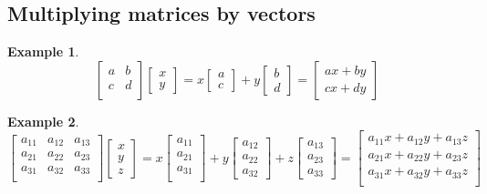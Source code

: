 \documentclass[table]{article}
\theoremstyle{definition}
\newtheorem{ex}{Example}[section]
\newcommand\y{\cellcolor{green!10}}
\begin{document}
  \subsection{Multiplying matrices by vectors}
  \begin{ex}
    \begin{equation}
      \begin{bmatrix}
        a & b \\
        c & d \\
      \end{bmatrix}
      \begin{bmatrix}
        x \\ y
      \end{bmatrix} 
       = x \begin{bmatrix}
        a \\ c
       \end{bmatrix}
       + y \begin{bmatrix}
         b \\ d
       \end{bmatrix}
       = \begin{bmatrix}
         ax + by \\
         cx + dy
       \end{bmatrix}
    \end{equation}
  \end{ex}
  \begin{ex}
    \begin{equation}
      \begin{bmatrix}
        a_{11} & a_{12} & a_{13} \\
        a_{21} & a_{22} & a_{23} \\
        a_{31} & a_{32} & a_{33} \\
      \end{bmatrix}
      \begin{bmatrix}
        x\\y\\z
      \end{bmatrix}
       = x \begin{bmatrix}
         a_{11} \\ a_{21} \\ a_{31}\\
       \end{bmatrix}
       + y \begin{bmatrix}
         a_{12} \\ a_{22} \\ a_{32}
       \end{bmatrix}
       + z \begin{bmatrix}
         a_{13} \\ a_{23} \\ a_{33}
       \end{bmatrix}
       = \begin{bmatrix}
         a_{11}x + a_{12}y + a_{13}z \\
         a_{21}x + a_{22}y + a_{23}z \\
         a_{31}x + a_{32}y + a_{33}z \\
       \end{bmatrix}
    \end{equation}
  \end{ex}
\end{document}

